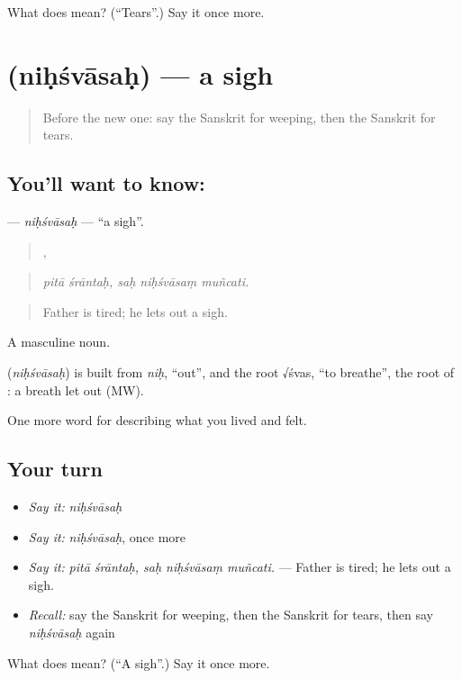 \begin{tcolorbox}[breakable,colback=teal!4,colframe=teal!35!black,title={Before you move on}]
What does  mean? (\textquotedblleft{}Tears\textquotedblright{}.) Say it once more.
\end{tcolorbox}
\section[\texorpdfstring{\sk{निःश्वासः} (niḥśvāsaḥ)}{निःश्वासः (niḥśvāsaḥ)}]{ (niḥśvāsaḥ) — a sigh}

\label{lesson:SA-C450-nihsvasah}



\begin{quote}
Before the new one: say the Sanskrit for weeping, then the Sanskrit for tears.
\end{quote}

\subsection*{You'll want to know: }
\textbf{} — \emph{niḥśvāsaḥ} — \textquotedblleft{}a sigh\textquotedblright{}.

\begin{quote}
 ,   
\end{quote}

\begin{quote}
\emph{pitā śrāntaḥ, saḥ niḥśvāsaṃ muñcati.}
\end{quote}

\begin{quote}
Father is tired; he lets out a sigh.
\end{quote}

A masculine noun.

\begin{cousinweb}
\textbf{} (\emph{niḥśvāsaḥ}) is built from \emph{niḥ}, \textquotedblleft{}out\textquotedblright{}, and the root √śvas, \textquotedblleft{}to breathe\textquotedblright{}, the root of \textbf{}: a breath let out (MW).
\end{cousinweb}

\begin{grammarlens}[title={What you've built}]
One more word for describing what you lived and felt.
\end{grammarlens}

\subsection*{Your turn}
\begin{itemize}
\raggedright
  \item \emph{Say it:} \emph{niḥśvāsaḥ}
  \item \emph{Say it:} \emph{niḥśvāsaḥ}, once more
  \item \emph{Say it:} \emph{pitā śrāntaḥ, saḥ niḥśvāsaṃ muñcati.} — Father is tired; he lets out a sigh.
  \item \emph{Recall:} say the Sanskrit for weeping, then the Sanskrit for tears, then say \emph{niḥśvāsaḥ} again
\end{itemize}

\begin{tcolorbox}[breakable,colback=teal!4,colframe=teal!35!black,title={Before you move on}]
What does  mean? (\textquotedblleft{}A sigh\textquotedblright{}.) Say it once more.
\end{tcolorbox}

